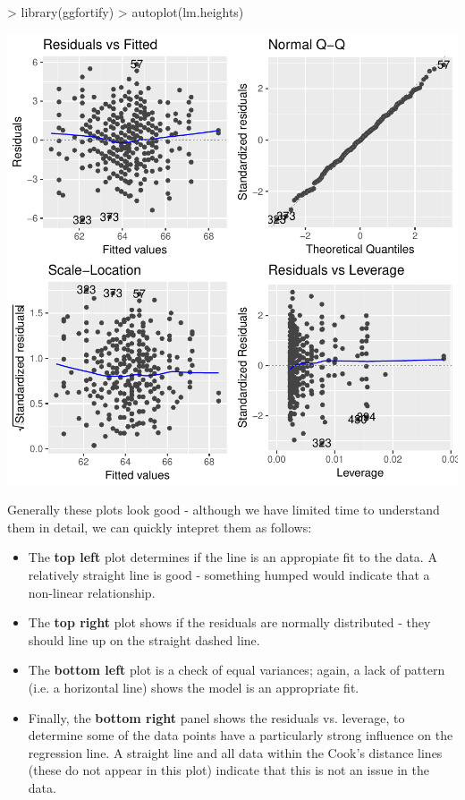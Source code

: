 \documentclass[a4paper,12pt]{article}
\begin{document}
\begin{shaded}
\begin{Schunk}
\begin{Sinput}
> library(ggfortify)
> autoplot(lm.heights)
\end{Sinput}
\end{Schunk}
\includegraphics{1_Stats_Course_Notes-knitr-020}
\end{shaded}

Generally these plots look good - although we have limited time to understand them in detail, we can quickly intepret them as follows:

\begin{itemize}
\item The \textbf{top left} plot determines if the line is an appropiate fit to the data. A relatively straight line is good - something humped would indicate that a non-linear relationship. 
\item The \textbf{top right} plot shows if the residuals are normally distributed - they should line up on the straight dashed line.
\item The \textbf{bottom left} plot is a check of equal variances; again, a lack of pattern (i.e. a horizontal line) shows the model is an appropriate fit.
\item Finally, the \textbf{bottom right} panel shows the residuals vs. leverage, to determine some of the data points have a particularly strong influence on the regression line. A straight line and all data within the Cook's distance lines (these do not appear in this plot) indicate that this is not an issue in the data.
\end{itemize}
\end{document}
